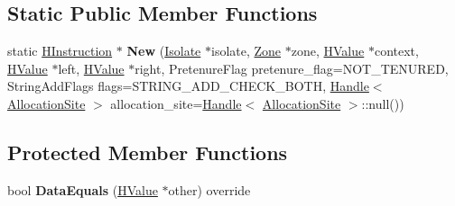 \subsection*{Static Public Member Functions}
\begin{DoxyCompactItemize}
\item 
static \hyperlink{classv8_1_1internal_1_1_h_instruction}{H\+Instruction} $\ast$ {\bfseries New} (\hyperlink{classv8_1_1internal_1_1_isolate}{Isolate} $\ast$isolate, \hyperlink{classv8_1_1internal_1_1_zone}{Zone} $\ast$zone, \hyperlink{classv8_1_1internal_1_1_h_value}{H\+Value} $\ast$context, \hyperlink{classv8_1_1internal_1_1_h_value}{H\+Value} $\ast$left, \hyperlink{classv8_1_1internal_1_1_h_value}{H\+Value} $\ast$right, Pretenure\+Flag pretenure\+\_\+flag=N\+O\+T\+\_\+\+T\+E\+N\+U\+R\+ED, String\+Add\+Flags flags=S\+T\+R\+I\+N\+G\+\_\+\+A\+D\+D\+\_\+\+C\+H\+E\+C\+K\+\_\+\+B\+O\+TH, \hyperlink{classv8_1_1internal_1_1_handle}{Handle}$<$ \hyperlink{classv8_1_1internal_1_1_allocation_site}{Allocation\+Site} $>$ allocation\+\_\+site=\hyperlink{classv8_1_1internal_1_1_handle}{Handle}$<$ \hyperlink{classv8_1_1internal_1_1_allocation_site}{Allocation\+Site} $>$\+::null())\hypertarget{classv8_1_1internal_1_1_h_string_add_aa5ad005b9ff90488ed87030c569b4cd4}{}\label{classv8_1_1internal_1_1_h_string_add_aa5ad005b9ff90488ed87030c569b4cd4}

\end{DoxyCompactItemize}
\subsection*{Protected Member Functions}
\begin{DoxyCompactItemize}
\item 
bool {\bfseries Data\+Equals} (\hyperlink{classv8_1_1internal_1_1_h_value}{H\+Value} $\ast$other) override\hypertarget{classv8_1_1internal_1_1_h_string_add_aa94d72dd44babd6625a44fc38c489f63}{}\label{classv8_1_1internal_1_1_h_string_add_aa94d72dd44babd6625a44fc38c489f63}

\end{DoxyCompactItemize}
